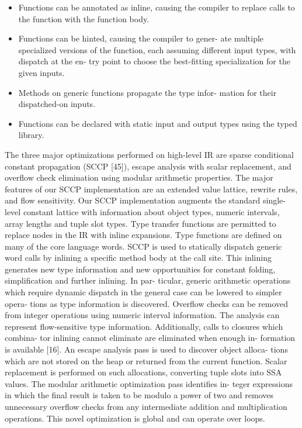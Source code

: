 \begin{itemize}

\item Functions can be annotated as inline, causing the compiler to replace
calls to the function with the function body.

\item Functions can be hinted, causing the compiler to gener- ate multiple
specialized versions of the function, each assuming different input types, with
dispatch at the en- try point to choose the best-ﬁtting specialization for the
given inputs.  

\item Methods on generic functions propagate the type infor- mation for their
dispatched-on inputs.  

\item Functions can be declared with static input and output types using the
typed library.

\end{itemize}

The three major optimizations performed on high-level IR are sparse conditional
constant propagation (SCCP [45]), escape analysis with scalar replacement, and
overﬂow check elimination using modular arithmetic properties.  The major
features of our SCCP implementation are an extended value lattice, rewrite
rules, and ﬂow sensitivity.  Our SCCP implementation augments the standard
single- level constant lattice with information about object types, numeric
intervals, array lengths and tuple slot types. Type transfer functions are
permitted to replace nodes in the IR with inline expansions. Type functions are
deﬁned on many of the core language words.  SCCP is used to statically dispatch
generic word calls by inlining a speciﬁc method body at the call site. This
inlining generates new type information and new opportunities for constant
folding, simpliﬁcation and further inlining. In par- ticular, generic
arithmetic operations which require dynamic dispatch in the general case can be
lowered to simpler opera- tions as type information is discovered. Overﬂow
checks can be removed from integer operations using numeric interval
information. The analysis can represent ﬂow-sensitive type information.
Additionally, calls to closures which combina- tor inlining cannot eliminate
are eliminated when enough in- formation is available [16].  An escape analysis
pass is used to discover object alloca- tions which are not stored on the heap
or returned from the current function. Scalar replacement is performed on such
allocations, converting tuple slots into SSA values.  The modular arithmetic
optimization pass identiﬁes in- teger expressions in which the ﬁnal result is
taken to be modulo a power of two and removes unnecessary overﬂow checks from
any intermediate addition and multiplication operations. This novel
optimization is global and can operate over loops.

